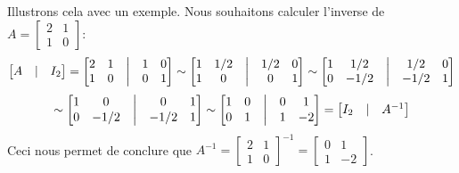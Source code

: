 \noindent Illustrons cela avec un exemple. Nous souhaitons calculer l'inverse de $A = \begin{bmatrix} 2 & 1 \\ 1 & 0\end{bmatrix}$: \\
$$\begin{bmatrix} A & | & I_2 \end{bmatrix} = 
\begin{bmatrix}
2 & 1 & \bigm| & 1 & 0 \\
1 & 0 & \bigm| & 0 & 1
\end{bmatrix} \sim 
\begin{bmatrix}
1 & 1/2 & \bigm| & 1/2 & 0 \\
1 & 0 & \bigm| & 0 & 1
\end{bmatrix} \sim
\begin{bmatrix}
1 & 1/2 & \bigm| & 1/2 & 0 \\
0 & -1/2 & \bigm| & -1/2 & 1
\end{bmatrix}$$ 
$$\sim
\begin{bmatrix}
1 & 0 & \bigm| & 0 & 1 \\
0 & -1/2 & \bigm| & -1/2 & 1
\end{bmatrix} \sim 
\begin{bmatrix}
1 & 0 & \bigm| & 0 & 1 \\
0 & 1 & \bigm| & 1 & -2
\end{bmatrix} = \begin{bmatrix} I_2 & | & A^{-1} \end{bmatrix}$$
Ceci nous permet de conclure que $A^{-1} = \begin{bmatrix} 2 & 1 \\ 1 & 0\end{bmatrix} ^{-1} = \begin{bmatrix} 0 & 1 \\ 1 & -2\end{bmatrix}$. \\